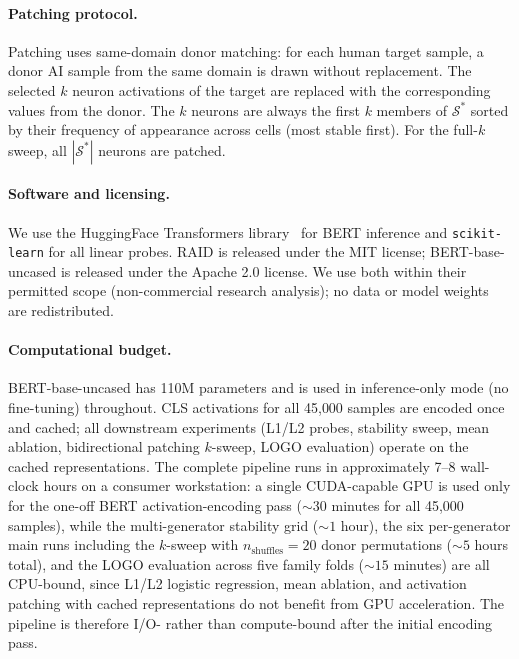 \documentclass[11pt]{article}
\newcommand{\bertbase}{BERT-base-uncased\xspace}
\begin{document}
\paragraph{Patching protocol.}
Patching uses same-domain donor matching: for each human target sample, a donor AI sample from the same domain is drawn without replacement. The selected $k$ neuron activations of the target are replaced with the corresponding values from the donor. The $k$ neurons are always the first $k$ members of $\mathcal{S}^{*}$ sorted by their frequency of appearance across cells (most stable first). For the full-$k$ sweep, all $|\mathcal{S}^{*}|$ neurons are patched.

\paragraph{Software and licensing.}
We use the HuggingFace Transformers library~\citep{wolf2020transformers} for BERT inference and \texttt{scikit-learn} for all linear probes. RAID is released under the MIT license; \bertbase is released under the Apache 2.0 license. We use both within their permitted scope (non-commercial research analysis); no data or model weights are redistributed.

\paragraph{Computational budget.}
\bertbase has 110M parameters and is used in inference-only mode (no fine-tuning) throughout. CLS activations for all 45{,}000 samples are encoded once and cached; all downstream experiments (L1/L2 probes, stability sweep, mean ablation, bidirectional patching $k$-sweep, LOGO evaluation) operate on the cached representations. The complete pipeline runs in approximately 7--8 wall-clock hours on a consumer workstation: a single CUDA-capable GPU is used only for the one-off BERT activation-encoding pass (${\sim}30$ minutes for all 45{,}000 samples), while the multi-generator stability grid (${\sim}1$ hour), the six per-generator main runs including the $k$-sweep with $n_{\text{shuffles}}=20$ donor permutations (${\sim}5$ hours total), and the LOGO evaluation across five family folds (${\sim}15$ minutes) are all CPU-bound, since L1/L2 logistic regression, mean ablation, and activation patching with cached representations do not benefit from GPU acceleration. The pipeline is therefore I/O- rather than compute-bound after the initial encoding pass.

\end{document}
